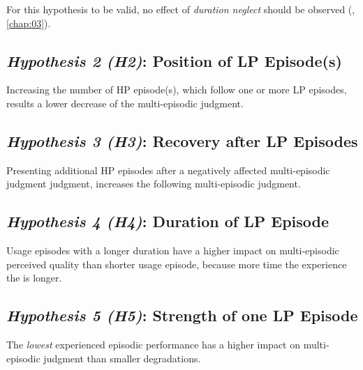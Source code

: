 For this hypothesis to be valid, no effect of \emph{duration neglect} should be observed (\cf, \autoref{chap:03}).


\subsection*{\emph{Hypothesis 2 (H2)}: Position of \ac{LP} Episode(s)}
\begin{hypothesis}[Hypothesis H2]
Increasing the number of \ac{HP} episode(s), which follow one or more \ac{LP} episodes, results a lower decrease of the multi-episodic judgment.
\end{hypothesis}


\subsection*{\emph{Hypothesis 3 (H3)}: Recovery after \ac{LP} Episodes}
\begin{hypothesis}[Hypothesis H3]
Presenting additional \ac{HP} episodes after a negatively affected multi-episodic judgment judgment, increases the following multi-episodic judgment.
\end{hypothesis}


\subsection*{\emph{Hypothesis 4 (H4)}: Duration of \ac{LP} Episode}
\begin{hypothesis}[Hypothesis H5]
Usage episodes with a longer duration have a higher impact on multi-episodic perceived quality than shorter usage episode, because more time the experience the is longer.
\end{hypothesis}

\subsection*{\emph{Hypothesis 5 (H5)}: Strength of one \ac{LP} Episode}
\begin{hypothesis}[Hypothesis H5]
The \emph{lowest} experienced episodic performance has a higher impact on multi-episodic judgment than smaller degradations.
\end{hypothesis}

